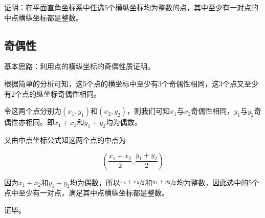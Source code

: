 

证明：在平面直角坐标系中任选5个横纵坐标均为整数的点，其中至少有一对点的中点横纵坐标都是整数。

\subsection{奇偶性}

基本思路：利用点的横纵坐标的奇偶性质证明。

根据简单的分析可知，这5个点的横坐标中至少有3个奇偶性相同，这3个点又至少有2个点的纵坐标奇偶性相同。

令这两个点分别为$(x_1, y_1)$和$(x_2, y_2)$，则我们可知$x_1$与$x_2$奇偶性相同，$y_1$与$y_2$奇偶性亦相同。即$x_1 + x_2$和$y_1 + y_2$均为偶数。

又由中点坐标公式知这两个点的中点为

\[ \left(\frac{x_1 + x_2}2, \frac{y_1 + y_2}2\right) \]

因为$x_1 + x_2$和$y_1 + y_2$均为偶数，所以$\sfrac{x_1 + x_2}2$和$\sfrac{y_1 + y_2}2$均为整数，因此选中的5个点中至少有一对点，满足其中点横纵坐标都是整数。

证毕。
